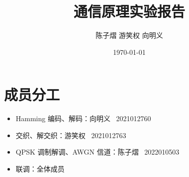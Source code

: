 \documentclass[a4paper]{article}  %
\begin{document}
\title{\textbf{通信原理实验报告}}
\author{陈子熠 \quad 游笑权 \quad 向明义}
\date{\today}
\maketitle

\tableofcontents

\newpage









\section{成员分工}

\begin{itemize}
    \item Hamming 编码、解码：向明义 \ 2021012760
    \item 交织、解交织：游笑权 \ 2021012763
    \item QPSK 调制解调、AWGN 信道：陈子熠 \ 2022010503
    \item 联调：全体成员
\end{itemize}




\end{document}
